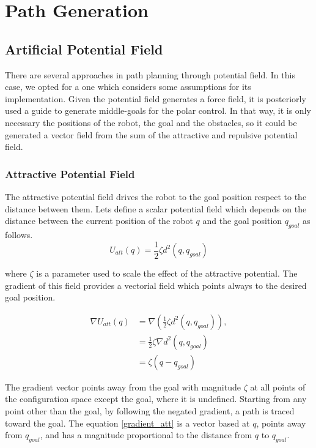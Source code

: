 \documentclass[conference]{IEEEtran}
\begin{document}
\section{Path Generation}
\label{sec:APF}
\subsection{Artificial Potential Field}
There are several approaches in path planning through potential field. In this case, we opted for a one which considers some assumptions for its implementation. Given the potential field generates a force field, it is posteriorly used a guide to generate middle-goals for the polar control. In that way, it is only necessary the positions of the robot, the goal and the obstacles, so it could be generated a vector field from the sum of the attractive  and repulsive potential field.\\

\subsubsection{\textbf{Attractive Potential Field}}
The attractive potential field drives the robot to the goal position respect to the distance between them. Lets define a scalar potential field which depends on the distance between the current position of the robot $q$ and the goal position $q_{goal}$ as follows. 
\begin{equation}
	U_{att}(q) = \frac{1}{2} \zeta d^2(q,q_{goal})
	\label{eq:pot_attr}
\end{equation}

where  $\zeta$  is a parameter used to scale the effect of the attractive potential. The gradient of this field provides a vectorial field which points always to the desired goal position.

\begin{equation}
	\label{gradient_att}
	\begin{aligned}
		\nabla U_{att}(q) &= \nabla (\frac{1}{2}\zeta d^2 (q,q_{goal})),\\
		&=\frac{1}{2}\zeta \nabla d^2(q,q_{goal})\\
		&= \zeta(q - q_{goal})
	\end{aligned}
\end{equation}

The gradient vector points away from the goal with magnitude $\zeta$ at all points of the configuration space except the goal, where it is undefined. Starting from any point other than the goal, by following the negated gradient, a path is traced toward the goal. The equation \ref{gradient_att} is a vector based at $q$, points away from $q_{goal}$, and has a magnitude proportional to the distance from $q$ to $q_{goal}$.\\
\end{document}
